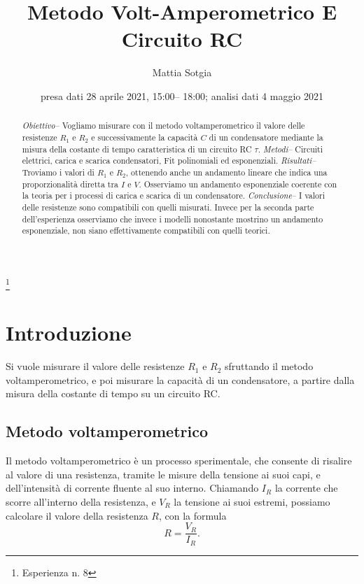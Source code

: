 \documentclass[
    reprint, 
    superscriptaddress, 
    altaffilletter, 
    amsmath, 
    amssymb, 
    a4paper
]{revtex4-2}
\begin{document}
\title{Metodo Volt-Amperometrico E Circuito RC}
\thanks{Esperienza n. 8}

\author{Mattia Sotgia}

\date{presa dati
28 aprile 2021, 15:00– 18:00; analisi dati 
4 maggio 2021}

\begin{abstract}
    \textit{Obiettivo-- }
    Vogliamo misurare con il metodo voltamperometrico il valore delle resistenze $R_1$ e $R_2$ e successivamente la capacità $C$ di un condensatore mediante la misura della costante di tempo caratteristica di un circuito RC $\tau$.
    \textit{Metodi-- }
    Circuiti elettrici, carica e scarica condensatori, Fit polinomiali ed esponenziali. 
    \textit{Risultati-- }
    Troviamo i valori di $R_1$ e $R_2$, ottenendo anche un andamento lineare che indica una proporzionalità diretta tra $I$ e $V$. Osserviamo un andamento esponenziale coerente con la teoria per i processi di carica e scarica di un condensatore.
    \textit{Conclusione-- }
    I valori delle resistenze sono compatibili con quelli misurati. Invece per la seconda parte dell'esperienza osserviamo che invece i modelli nonostante mostrino un andamento esponenziale, non siano effettivamente compatibili con quelli teorici.
\end{abstract}
\maketitle
\thispagestyle{fancy}

\section{Introduzione}
    \label{section:introduction}

    Si vuole misurare il valore delle resistenze $R_1$ e $R_2$ sfruttando il metodo voltamperometrico, e poi misurare la capacità di un condensatore, a partire dalla misura della costante di tempo su un circuito RC. 

    \subsection{Metodo voltamperometrico}

    Il metodo voltamperometrico è un processo sperimentale, che consente di risalire al valore di una resistenza, tramite le misure della tensione ai suoi capi, e dell’intensità di corrente fluente al suo interno. Chiamando $I_R$ la corrente che scorre all’interno della resistenza, e $V_R$ la tensione ai suoi estremi, possiamo calcolare il valore della resistenza $R$, con la formula \[R=\frac{V_R}{I_R}.\]
\end{document}
